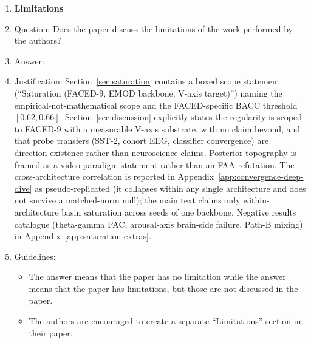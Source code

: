 \begin{enumerate}
\begin{itemize}
        \item The abstract and/or introduction should clearly state the claims made, including the contributions made in the paper and important assumptions and limitations. A \answerNo{} or \answerNA{} answer to this question will not be perceived well by the reviewers.
        \item The claims made should match theoretical and experimental results, and reflect how much the results can be expected to generalize to other settings.
        \item It is fine to include aspirational goals as motivation as long as it is clear that these goals are not attained by the paper.
    \end{itemize}

\item {\bf Limitations}
    \item[] Question: Does the paper discuss the limitations of the work performed by the authors?
    \item[] Answer: \answerYes{}
    \item[] Justification: Section~\ref{sec:saturation} contains a boxed scope statement (``Saturation (FACED-9, EMOD backbone, V-axis target)'') naming the empirical-not-mathematical scope and the FACED-specific BACC threshold $[0.62, 0.66]$. Section~\ref{sec:discussion} explicitly states the regularity is scoped to FACED-9 with a measurable V-axis substrate, with no claim beyond, and that probe transfers (SST-2, cohort EEG, classifier convergence) are direction-existence rather than neuroscience claims. Posterior-topography is framed as a video-paradigm statement rather than an FAA refutation. The cross-architecture correlation is reported in Appendix~\ref{app:convergence-deep-dive} as pseudo-replicated (it collapses within any single architecture and does not survive a matched-norm null); the main text claims only within-architecture basin saturation across seeds of one backbone. Negative results catalogue (theta-gamma PAC, arousal-axis brain-side failure, Path-B mixing) in Appendix~\ref{app:saturation-extras}.
    \item[] Guidelines:
    \begin{itemize}
        \item The answer \answerNA{} means that the paper has no limitation while the answer \answerNo{} means that the paper has limitations, but those are not discussed in the paper.
        \item The authors are encouraged to create a separate ``Limitations'' section in their paper.

\end{itemize}
\end{enumerate}
